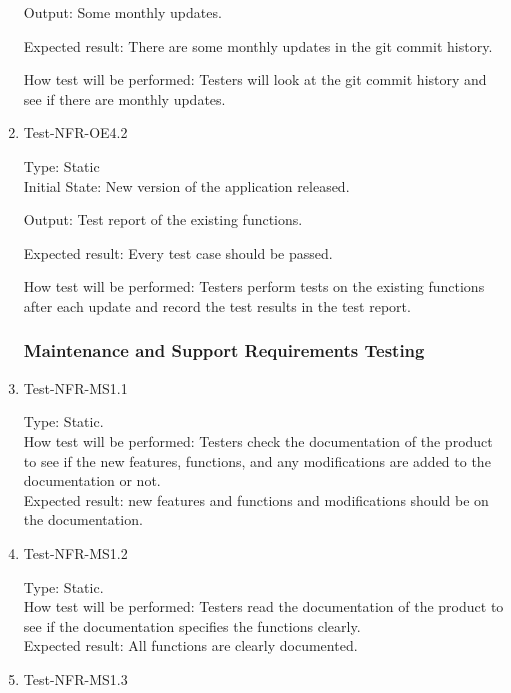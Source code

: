 \documentclass[12pt, titlepage]{article}
\begin{document}
\begin{enumerate}
Output: Some monthly updates.

Expected result: There are some monthly updates in the git commit history.

How test will be performed: Testers will look at the git commit history and see if there are monthly updates.

\item{Test-NFR-OE4.2\\}

Type: Static\\

Initial State: New version of the application released.

Output: Test report of the existing functions.

Expected result: Every test case should be passed.

How test will be performed: Testers perform tests on the existing functions after each update and record the test results in the test report.

\subsubsection{Maintenance and Support Requirements Testing}

\item{Test-NFR-MS1.1\\}

Type: Static.\\

How test will be performed: Testers check the documentation of the product to see if the new features, functions, and any modifications are added to the documentation or not.\\

Expected result: new features and functions and modifications should be on the documentation.

\item{Test-NFR-MS1.2\\}

Type: Static.\\

How test will be performed: Testers read the documentation of the product to see if the documentation specifies the functions clearly.\\

Expected result: All functions are clearly documented.

\item{Test-NFR-MS1.3\\} 


\end{enumerate}
\end{document}

